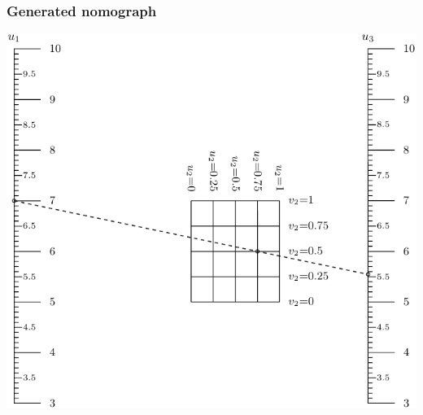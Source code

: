 \documentclass[a4paper,11pt,english]{sphinxmanual}
\begin{document}
\subsubsection{Generated nomograph}
\label{types/types:id43}
\includegraphics{ex_type9_nomo_1.pdf}
\end{document}
